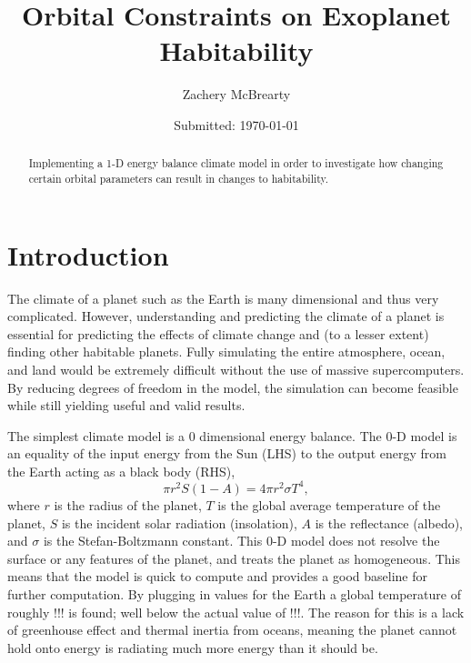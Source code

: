 \documentclass[12pt, onecolumn]{revtex4-2}    %
\begin{document}
\title{Orbital Constraints on Exoplanet Habitability}
\date{Submitted: \today{}}
\author{Zachery McBrearty}

\begin{abstract}

    Implementing a 1-D energy balance climate model in order to investigate how changing certain orbital parameters can result in changes to habitability.

\end{abstract}


\maketitle

\tableofcontents
\let\toc@pre\relax
\let\toc@post\relax

\newpage

\section{Introduction}

The climate of a planet such as the Earth is many dimensional and thus very complicated.
However, understanding and predicting the climate of a planet is essential for predicting the effects of climate change and (to a lesser extent) finding other habitable planets.
Fully simulating the entire atmosphere, ocean, and land would be extremely difficult without the use of massive supercomputers.
By reducing degrees of freedom in the model, the simulation can become feasible while still yielding useful and valid results.

The simplest climate model is a 0 dimensional energy balance.
The 0-D model is an equality of the input energy from the Sun (LHS) to the output energy from the Earth acting as a black body (RHS),
$$
    \pi r^2 S(1-A) = 4 \pi r^2 \sigma T^4,
$$
where $r$ is the radius of the planet, $T$ is the global average temperature of the planet, $S$ is the incident solar radiation (insolation), $A$ is the reflectance (albedo), and $\sigma$ is the Stefan-Boltzmann constant.
This 0-D model does not resolve the surface or any features of the planet, and treats the planet as homogeneous.
This means that the model is quick to compute and provides a good baseline for further computation.
By plugging in values for the Earth a global temperature of roughly !!! is found; well below the actual value of !!!.
The reason for this is a lack of greenhouse effect and thermal inertia from oceans, meaning the planet cannot hold onto energy is radiating much more energy than it should be.
\end{document}
